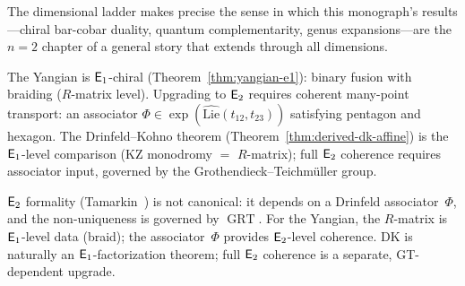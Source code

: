 The dimensional ladder makes precise the sense in which this
monograph's results---chiral bar-cobar duality, quantum
complementarity, genus expansions---are the $n = 2$ chapter
of a general story that extends through all dimensions.

\begin{remark}
\label{rem:e1-e2-obstruction}
The Yangian is $\mathsf{E}_1$-chiral (Theorem~\ref{thm:yangian-e1}):
binary fusion with braiding ($R$-matrix level).  Upgrading to
$\mathsf{E}_2$ requires coherent many-point transport: an associator
$\Phi \in \exp(\widehat{\mathrm{Lie}}(t_{12}, t_{23}))$
satisfying pentagon and hexagon.  The Drinfeld--Kohno theorem
(Theorem~\ref{thm:derived-dk-affine}) is the $\mathsf{E}_1$-level
comparison (KZ monodromy $=$ $R$-matrix); full $\mathsf{E}_2$ coherence
requires associator input, governed by the
Grothendieck--Teichm\"uller group.
\end{remark}

\begin{remark}
\label{rem:grothendieck-teichmuller}
$\mathsf{E}_2$ formality (Tamarkin~\cite{Tamarkin00}) is not canonical:
it depends on a Drinfeld associator~$\Phi$, and the non-uniqueness
is governed by $\operatorname{GRT}$.  For the Yangian, the
$R$-matrix is $\mathsf{E}_1$-level data (braid); the associator~$\Phi$
provides $\mathsf{E}_2$-level coherence.  DK is naturally an
$\mathsf{E}_1$-factorization theorem; full $\mathsf{E}_2$ coherence is a
separate, GT-dependent upgrade.
\end{remark}
